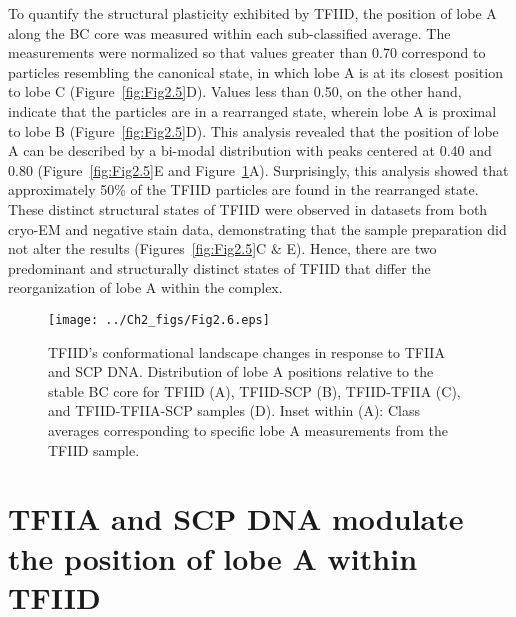 \indent To quantify the structural plasticity exhibited by TFIID, the position of lobe A along the BC core was measured within each sub-classified average. The measurements were normalized so that values greater than 0.70 correspond to particles resembling the canonical state, in which lobe A is at its closest position to lobe C (Figure~\ref{fig:Fig2.5}D). Values less than 0.50, on the other hand, indicate that the particles are in a rearranged state, wherein lobe A is proximal to lobe B (Figure~\ref{fig:Fig2.5}D). This analysis revealed that the position of lobe A can be described by a bi-modal distribution with peaks centered at 0.40 and 0.80 (Figure~\ref{fig:Fig2.5}E and Figure~\ref{fig:Fig2.6}A). Surprisingly, this analysis showed that approximately 50\% of the TFIID particles are found in the rearranged state. These distinct structural states of TFIID were observed in datasets from both cryo-EM and negative stain data, demonstrating that the sample preparation did not alter the results (Figures~\ref{fig:Fig2.5}C \& E). Hence, there are two predominant and structurally distinct states of TFIID that differ the reorganization of lobe A within the complex.
\begin{figure}
\centering
\texttt{[image: ../Ch2\_figs/Fig2.6.eps]}
\caption[TFIID’s conformational landscape changes in response to TFIIA and SCP DNA]{TFIID’s conformational landscape changes in response to TFIIA and SCP DNA. Distribution of lobe A positions relative to the stable BC core for TFIID (A), TFIID-SCP (B), TFIID-TFIIA (C), and TFIID-TFIIA-SCP samples (D). Inset within (A): Class averages corresponding to specific lobe A measurements from the TFIID sample.}
\label{fig:Fig2.6}
\end{figure}
\section{TFIIA and SCP DNA modulate the position of lobe A within TFIID}

